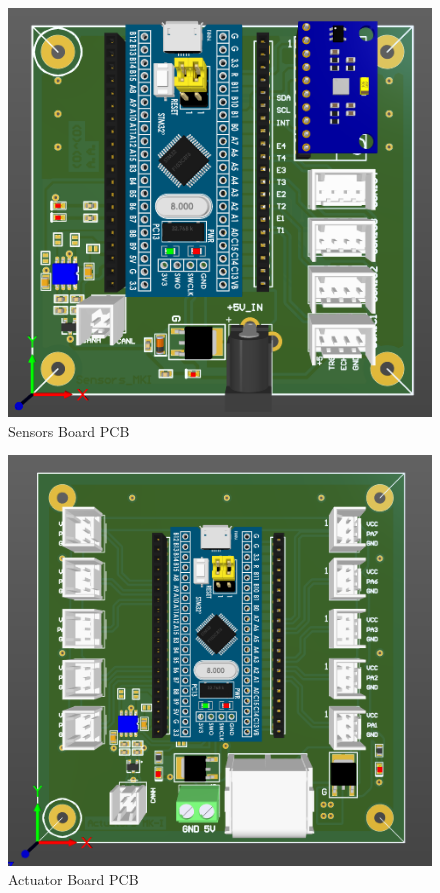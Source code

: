 \newpage

\begin{figure}[h!]
	\centering
	\includegraphics[scale=0.8]{Figures/HW/pcb-sensi-boi.png}
	\caption{Sensors Board PCB}
	\label{fig:hw-sense-pcb}
\end{figure}


\begin{figure}[h!]
	\centering
	\includegraphics[scale=0.8]{Figures/HW/pcb-actuator.png}
	\caption{Actuator Board PCB}
	\label{fig:hw-servo-pcb}
\end{figure}

